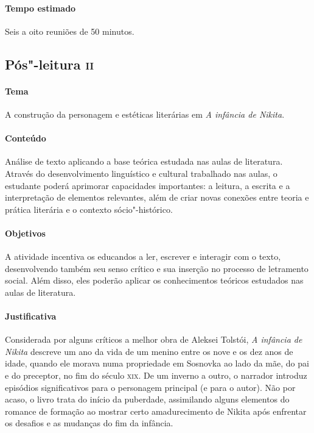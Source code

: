 \documentclass[11pt]{extarticle}
\begin{document}
\paragraph{Tempo estimado} Seis a oito reuniões de 50 minutos.

\subsection{Pós"-leitura \textsc{ii}}

\paragraph{Tema} A construção da personagem e estéticas literárias em \emph{A infância de Nikita}.

\bnccativividadesposleitura

\paragraph{Conteúdo}
Análise de texto aplicando a base teórica estudada nas aulas de
literatura. Através do desenvolvimento linguístico e cultural trabalhado
nas aulas, o estudante poderá aprimorar capacidades importantes: a
leitura, a escrita e a interpretação de elementos relevantes, além de
criar novas conexões entre teoria e prática literária e o contexto
sócio"-histórico.

\paragraph{Objetivos}
A atividade incentiva os educandos a ler, escrever e interagir com o
texto, desenvolvendo também seu senso crítico e sua inserção no processo
de letramento social. Além disso, eles poderão aplicar os conhecimentos
teóricos estudados nas aulas de literatura.

\paragraph{Justificativa}
Considerada por alguns críticos a melhor obra de Aleksei Tolstói,
\emph{A infância de Nikita} descreve um ano da vida de um menino entre
os nove e os dez anos de idade, quando ele morava numa propriedade em
Sosnovka ao lado da mãe, do pai e do preceptor, no fim do século \textsc{xix}. De
um inverno a outro, o narrador introduz episódios significativos para o
personagem principal (e para o autor). Não por acaso, o livro trata do
início da puberdade, assimilando alguns elementos do romance de formação
ao mostrar certo amadurecimento de Nikita após enfrentar os desafios e
as mudanças do fim da infância.
\end{document}
